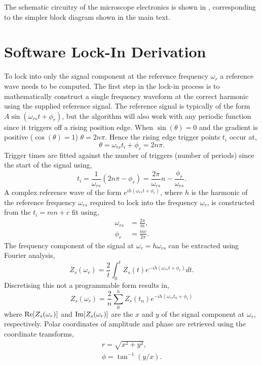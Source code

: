 \documentclass[12pt, a4paper, oneside]{book}
\begin{document}
The schematic circuitry of the microscope electronics is shown in , corresponding to the simpler block diagram shown in the main text.

\FloatBarrier
\section{Software Lock-In Derivation}

To lock into only the signal component at the reference frequency $\omega_r$ a reference wave needs to be computed. The first step in the lock-in process is to mathematically construct a single frequency waveform at the correct harmonic using the supplied reference signal. The reference signal is typically of the form $A\sin(\omega_{rs} t + \phi_r)$, but the algorithm will also work with any periodic function since it triggers off a rising position edge.
When $\sin(\theta)=0$ and the gradient is positive ($\cos(\theta)=1$) $\theta=2n\pi$. Hence the rising edge trigger points $t_i$ occur at,
\begin{equation} \theta = \omega_{rs} t_i + \phi_r = 2n\pi. \end{equation}
Trigger times are fitted against the number of triggers (number of periods) since the start of the signal using,
\begin{equation}
t_i = \frac{1}{\omega_{rs}}(2n\pi - \phi_r) = \frac{2\pi}{\omega_{rs}}n - \frac{\phi_r}{\omega_{rs}}.
\end{equation}
A complex reference wave of the form $e^{ih(\omega_{rs} t + \phi_r)}$, where $h$ is the harmonic of the reference frequency $\omega_{rs}$ required to lock into the frequency $\omega_r$, is constructed from the $t_i=mn+c$ fit using,
\begin{align}
\omega_{rs} &= \frac{2\pi}{m}, \\
\phi_r &= \frac{mc}{2\pi}.
\end{align}
The frequency component of the signal at $\omega_r=h\omega_{rs}$ can be extracted using Fourier analysis,
\begin{equation}
Z_s(\omega_r) = \frac{2}{t} \int_0^t{Z_s(t) e^{-ih(\omega_{rs} t + \phi_r)} dt}.
\end{equation}
Discretising this not a programmable form results in,
\begin{equation}
Z_s(\omega_r) = \frac{2}{n} \sum_0^n{Z_s(t_n) e^{-ih(\omega_{rs} t_n + \phi_r)}}
\end{equation}
where $\mathrm{Re}\!\left[{Z_s(\omega_r)}\right]$ and $\mathrm{Im}\!\left[{Z_s(\omega_r)}\right]$ are the $x$ and $y$ of the signal component at $\omega_r$, respectively. Polar coordinates of amplitude and phase are retrieved using the coordinate transforms,
\begin{align}
r = \sqrt{x^2 + y^2}, \\
\phi = \tan^{-1}(y/x).
\end{align}
\end{document}
